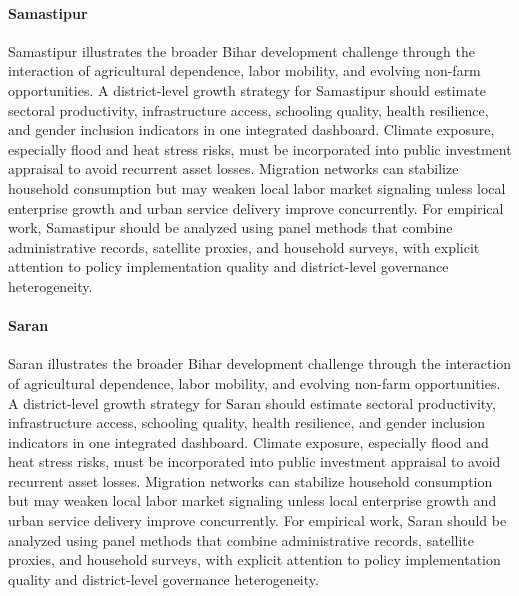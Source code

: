 \documentclass[preprint,12pt]{elsarticle}
\begin{document}
\paragraph{Samastipur} Samastipur illustrates the broader Bihar development challenge through the interaction of agricultural dependence, labor mobility, and evolving non-farm opportunities. A district-level growth strategy for Samastipur should estimate sectoral productivity, infrastructure access, schooling quality, health resilience, and gender inclusion indicators in one integrated dashboard. Climate exposure, especially flood and heat stress risks, must be incorporated into public investment appraisal to avoid recurrent asset losses. Migration networks can stabilize household consumption but may weaken local labor market signaling unless local enterprise growth and urban service delivery improve concurrently. For empirical work, Samastipur should be analyzed using panel methods that combine administrative records, satellite proxies, and household surveys, with explicit attention to policy implementation quality and district-level governance heterogeneity.

\paragraph{Saran} Saran illustrates the broader Bihar development challenge through the interaction of agricultural dependence, labor mobility, and evolving non-farm opportunities. A district-level growth strategy for Saran should estimate sectoral productivity, infrastructure access, schooling quality, health resilience, and gender inclusion indicators in one integrated dashboard. Climate exposure, especially flood and heat stress risks, must be incorporated into public investment appraisal to avoid recurrent asset losses. Migration networks can stabilize household consumption but may weaken local labor market signaling unless local enterprise growth and urban service delivery improve concurrently. For empirical work, Saran should be analyzed using panel methods that combine administrative records, satellite proxies, and household surveys, with explicit attention to policy implementation quality and district-level governance heterogeneity.
\end{document}
